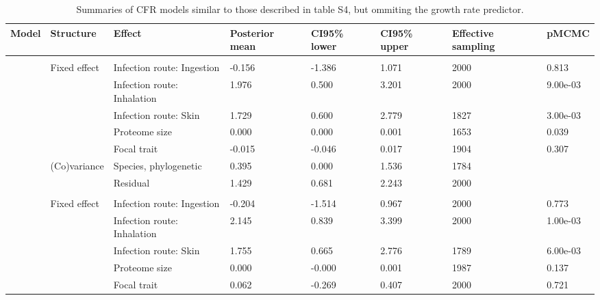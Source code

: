 \begin{table}

\caption{\label{tab:}Summaries of CFR models similar to those described in table S4, but ommiting the growth rate predictor.}
\centering
\begin{tabular}[t]{llllllll}
\toprule
Model & Structure & Effect & Posterior
 mean & CI95\% lower & CI95\% upper & Effective
 sampling & pMCMC\\
\midrule
\addlinespace[0.3em]
\multicolumn{8}{l}{\textbf{Secretome}}\\
\hspace{1em} & Fixed effect & Infection route: Ingestion & -0.156 & -1.386 & 1.071 & 2000 & 0.813\\
\hspace{1em} &  & Infection route: Inhalation & 1.976 & 0.500 & 3.201 & 2000 & 9.00e-03\\
\hspace{1em} &  & Infection route: Skin & 1.729 & 0.600 & 2.779 & 1827 & 3.00e-03\\
\hspace{1em} &  & Proteome size & 0.000 & 0.000 & 0.001 & 1653 & 0.039\\
\hspace{1em} &  & Focal trait & -0.015 & -0.046 & 0.017 & 1904 & 0.307\\
\hspace{1em} & (Co)variance & Species, phylogenetic & 0.395 & 0.000 & 1.536 & 1784 & \\
\hspace{1em} &  & Residual & 1.429 & 0.681 & 2.243 & 2000 & \\
\addlinespace[0.3em]
\multicolumn{8}{l}{\textbf{Biofilm}}\\
\hspace{1em} & Fixed effect & Infection route: Ingestion & -0.204 & -1.514 & 0.967 & 2000 & 0.773\\
\hspace{1em} &  & Infection route: Inhalation & 2.145 & 0.839 & 3.399 & 2000 & 1.00e-03\\
\hspace{1em} &  & Infection route: Skin & 1.755 & 0.665 & 2.776 & 1789 & 6.00e-03\\
\hspace{1em} &  & Proteome size & 0.000 & -0.000 & 0.001 & 1987 & 0.137\\
\hspace{1em} &  & Focal trait & 0.062 & -0.269 & 0.407 & 2000 & 0.721\\

\end{tabular}
\end{table}
